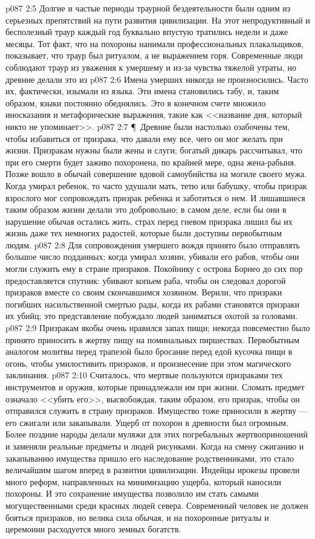 \vs p087 2:5 Долгие и частые периоды траурной бездеятельности были одним из серьезных препятствий на пути развития цивилизации. На этот непродуктивный и бесполезный траур каждый год буквально впустую тратились недели и даже месяцы. Тот факт, что на похороны нанимали профессиональных плакальщиков, показывает, что траур был ритуалом, а не выражением горя. Современные люди соблюдают траур из уважения к умершему и из\hyp{}за чувства тяжелой утраты, но древние делали это из 
\vs p087 2:6 Имена умерших никогда не произносились. Часто их, фактически, изымали из языка. Эти имена становились табу, и, таким образом, языки постоянно обеднялись. Это в конечном счете множило иносказания и метафорические выражения, такие как <<название дня, который никто не упоминает>>.
\vs p087 2:7 \P\ Древние были настолько озабочены тем, чтобы избавиться от призрака, что давали ему все, чего он мог желать при жизни. Призракам нужны были жены и слуги; богатый дикарь рассчитывал, что при его смерти будет заживо похоронена, по крайней мере, одна жена\hyp{}рабыня. Позже вошло в обычай совершение вдовой самоубийства на могиле своего мужа. Когда умирал ребенок, то часто удушали мать, тетю или бабушку, чтобы призрак взрослого мог сопровождать призрак ребенка и заботиться о нем. И лишавшиеся таким образом жизни делали это добровольно; в самом деле, если бы они в нарушение обычая остались жить, страх перед гневом призрака лишил бы их жизнь даже тех немногих радостей, которые были доступны первобытным людям.
\vs p087 2:8 Для сопровождения умершего вождя принято было отправлять большое число подданных; когда умирал хозяин, убивали его рабов, чтобы они могли служить ему в стране призраков. Покойнику с острова Борнео до сих пор предоставляется спутник: убивают копьем раба, чтобы он следовал дорогой призраков вместе со своим скончавшимся хозяином. Верили, что призраки погибших насильственной смертью рады, когда их рабами становятся призраки их убийц; это представление побуждало людей заниматься охотой за головами.
\vs p087 2:9 Призракам якобы очень нравился запах пищи; некогда повсеместно было принято приносить в жертву пищу на поминальных пиршествах. Первобытным аналогом молитвы перед трапезой было бросание перед едой кусочка пищи в огонь, чтобы умилостивить призраков, и произнесение при этом магического заклинания.
\vs p087 2:10 Считалось, что мертвые пользуются призраками тех инструментов и оружия, которые принадлежали им при жизни. Сломать предмет означало <<убить его>>, высвобождая, таким образом, его призрак, чтобы он отправился служить в страну призраков. Имущество тоже приносили в жертву --- его сжигали или закапывали. Ущерб от похорон в древности был огромным. Более поздние народы делали муляжи для этих погребальных жертвоприношений и заменяли реальные предметы и людей рисунками. Когда на смену сжиганию и закапыванию имущества пришло его наследование родственниками, это стало величайшим шагом вперед в развитии цивилизации. Индейцы ирокезы провели много реформ, направленных на минимизацию ущерба, который наносили похороны. И это сохранение имущества позволило им стать самыми могущественными среди красных людей севера. Современный человек не должен бояться призраков, но велика сила обычая, и на похоронные ритуалы и церемонии расходуется много земных богатств.
